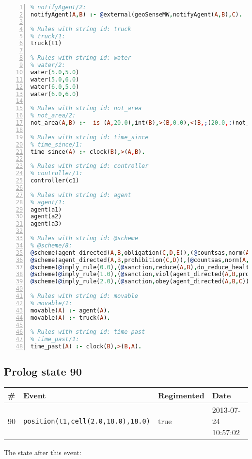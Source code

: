 \documentclass[11pt]{article}\usepackage[utf8]{inputenc}\usepackage{geometry}
\begin{document}
\begin{lstlisting}[language=Prolog, numbers=left]
% Rules with string id: notifyAgent
% notifyAgent/2:
notifyAgent(A,B) :- @external(geoSenseMW,notifyAgent(A,B),C).

% Rules with string id: truck
% truck/1:
truck(t1)

% Rules with string id: water
% water/2:
water(5.0,5.0)
water(5.0,6.0)
water(6.0,5.0)
water(6.0,6.0)

% Rules with string id: not_area
% not_area/2:
not_area(A,B) :-  is (A,20.0),int(B),>(B,0.0),<(B,;(20.0,:(not_area(A,B), is (-(B),20.0)))),int(A),>(A,0.0),<(A,;(20.0,:(area(A,B),-(int(A))))),int(B),>(A,0.0),>(B,0.0),<(A,21.0),<(B,21.0).

% Rules with string id: time_since
% time_since/1:
time_since(A) :- clock(B),>(A,B).

% Rules with string id: controller
% controller/1:
controller(c1)

% Rules with string id: agent
% agent/1:
agent(a1)
agent(a2)
agent(a3)

% Rules with string id: @scheme
% @scheme/8:
@scheme(agent_directed(A,B,obligation(C,D,E)),(@countsas,norm(A,B,F,obligation(C,D,E)),F),false,(listTrue(C)),(time_past(D)),false,[plus(viol(agent_directed(A,B,obligation(C,D,E))))|[]],[plus(obey(agent_directed(A,B,obligation(C,D,E))))|[]])
@scheme(agent_directed(A,B,prohibition(C,D)),(@countsas,norm(A,B,E,prohibition(C,D)),E),(listTrue(C)),false,(false),false,[plus(viol(agent_directed(A,B,prohibition(C,D))))|[]],[plus(obey(agent_directed(A,B,prohibition(C,D))))|[]])
@scheme(@imply_rule(0.0),(@sanction,reduce(A,B),do_reduce_health(A,B),notifyAgent(A,changed(status))),true,false,false,false,[min(reduce(A,B))|[]],[])
@scheme(@imply_rule(1.0),(@sanction,viol(agent_directed(A,B,prohibition(C,D))),do_sanction(D)),true,false,false,false,[min(viol(agent_directed(A,B,prohibition(C,D))))|[]],[])
@scheme(@imply_rule(2.0),(@sanction,obey(agent_directed(A,B,C))),true,false,false,false,[min(obey(agent_directed(A,B,C)))|[]],[])

% Rules with string id: movable
% movable/1:
movable(A) :- agent(A).
movable(A) :- truck(A).

% Rules with string id: time_past
% time_past/1:
time_past(A) :- clock(B),>(B,A).

\end{lstlisting}
\clearpage 
\subsection{Prolog state 90}
\begin{table}[ht]
\centering 
\begin{tabular}{l l l l} 
\textbf{\#} & \textbf{Event} & \textbf{Regimented} & \textbf{Date} \\ [0.5ex] 
\hline
90&\texttt{position(t1,cell(2.0,18.0),18.0)}&true&2013-07-24 10:57:02\\ [1ex] \hline\end{tabular}
\end{table}
The state after this event:
\end{document}
